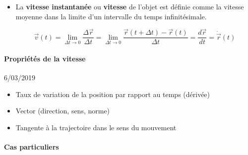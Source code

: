 \documentclass[
    11pt,
    a4paper,
    oneside,
    headinlcude, footinclude,
    twoside,
]{report}
\newcommand{\markDate}[1]{\begin{flushright}#1\end{flushright}}
\renewcommand{\vec}[1]{\overrightarrow{#1}}
\begin{document}
\begin{itemize}
\item La \textbf{vitesse instantanée} ou \textbf{vitesse} de l'objet est
définie comme la vitesse moyenne dans la limite d'un intervalle du
temps infinitésimale.

\begin{equation}
\label{eq:2.13}
\vec v (t) = \lim_{\Delta t \to 0} \frac{\Delta \vec r}{\Delta t}
= \lim_{\Delta t \to 0} \frac{\vec r (t + \Delta t) - \vec r (t)}{\Delta t}
= \frac{d\vec r}{dt} = \dot{\vec r} (t)
\end{equation}
\end{itemize}

\paragraph{Propriétés de la vitesse}
\label{par:proprietes_de_la_vitesse}

\markDate{6/03/2019}


\begin{itemize}
\item Taux de variation de la position par rapport au temps (dérivée)
\item Vector (direction, sens, norme)
\item Tangente à la trajectoire dans le sens du mouvement
\end{itemize}



\paragraph{Cas particuliers}
\end{document}
